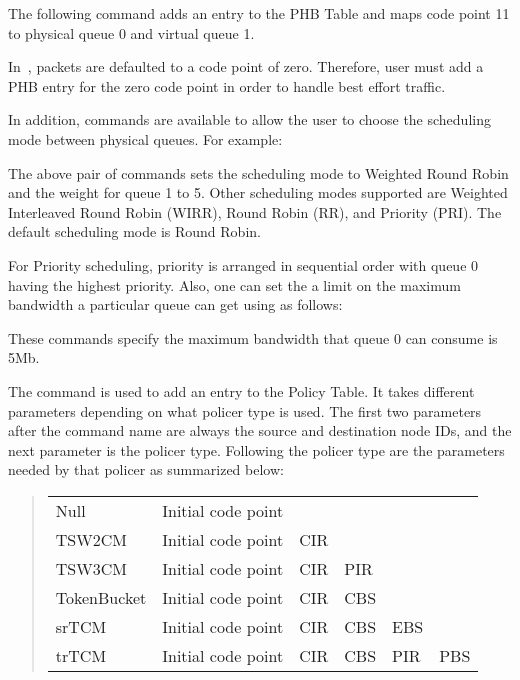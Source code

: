 The following command adds an entry to the PHB Table and 
  maps code point 11 to physical queue 0 and virtual queue 1. 


In~\ns, packets are defaulted to a code point of zero.
Therefore, user must add a PHB entry for the zero code point in order to 
 handle best effort traffic.

In addition, commands are available to allow the user to choose the 
  scheduling mode between physical queues. 
For example:



The above pair of commands sets the scheduling mode to Weighted Round Robin 
  and the weight for queue 1 to 5. 
Other scheduling modes supported are 
  Weighted Interleaved Round Robin (WIRR), Round Robin (RR), 
  and Priority (PRI). 
The default scheduling mode is Round Robin.

For Priority scheduling, 
  priority is arranged in sequential order with 
  queue 0 having the highest priority. 
Also, one can set the a limit on the maximum bandwidth 
  a particular queue can get using as follows:



These commands specify the maximum bandwidth that 
  queue 0 can consume is 5Mb.

The  command is used to 
  add an entry to the Policy Table.  
It takes different parameters depending on what policer type is used.  
The first two parameters after the command name are always 
  the source and destination node IDs, 
  and the next parameter is the policer type. 
Following the policer type are the parameters needed by that policer as 
summarized below:

\begin{quote}
\begin{tabular}{llllll}
Null&{Initial code point}\\
TSW2CM&{Initial code point}&CIR\\
TSW3CM&{Initial code point}&CIR&PIR\\
TokenBucket&{Initial code point}&CIR&CBS\\
srTCM&{Initial code point}&CIR&CBS&EBS\\
trTCM&{Initial code point}&CIR&CBS&PIR&PBS
\end{tabular}
\end{quote}
 
